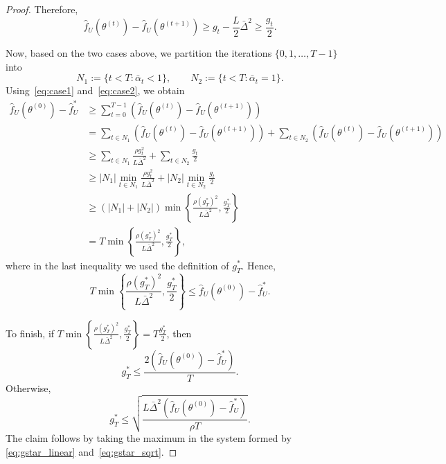 \documentclass{article}
\begin{document}
\begin{proof}
Therefore,
\begin{equation}\label{eq:case2}
    \widehat f_U(\theta^{(t)})
    -
    \widehat f_U(\theta^{(t+1)})
    \ge
    g_t-\frac{L}{2}\bar\Delta^2
    \ge
    \frac{g_t}{2}.
\end{equation}

Now, based on the two cases above, we partition the iterations
\(\{0,1,\ldots,T-1\}\) into
\[
    N_1
    :=
    \{t<T:\bar{\alpha}_t<1\},
    \qquad
    N_2
    :=
    \{t<T:\bar{\alpha}_t=1\}.
\]
Using~\eqref{eq:case1} and~\eqref{eq:case2}, we obtain
\[
\begin{aligned}
    \widehat f_U(\theta^{(0)})-\widehat f_U^*
    &\ge
    \sum_{t=0}^{T-1}
    \left(
        \widehat f_U(\theta^{(t)})
        -
        \widehat f_U(\theta^{(t+1)})
    \right)                                                        \\
    &=
    \sum_{t\in N_1}
    \left(
        \widehat f_U(\theta^{(t)})
        -
        \widehat f_U(\theta^{(t+1)})
    \right)
    +
    \sum_{t\in N_2}
    \left(
        \widehat f_U(\theta^{(t)})
        -
        \widehat f_U(\theta^{(t+1)})
    \right)                                                        \\
    &\ge
    \sum_{t\in N_1}
    \frac{\rho g_t^2}{L\bar\Delta^2}
    +
    \sum_{t\in N_2}
    \frac{g_t}{2}                                                   \\
    &\ge
    |N_1|
    \min_{t\in N_1}
    \frac{\rho g_t^2}{L\bar\Delta^2}
    +
    |N_2|
    \min_{t\in N_2}
    \frac{g_t}{2}                                                   \\
    &\ge
    \left(|N_1|+|N_2|\right)
    \min\left\{
        \frac{\rho (g_T^*)^2}{L\bar\Delta^2},
        \frac{g_T^*}{2}
    \right\}                                                        \\
    &=
    T
    \min\left\{
        \frac{\rho (g_T^*)^2}{L\bar\Delta^2},
        \frac{g_T^*}{2}
    \right\},
\end{aligned}
\]
where in the last inequality we used the definition of $g_T^*$.
Hence,
\[
    T
    \min\left\{
        \frac{\rho (g_T^*)^2}{L\bar\Delta^2},
        \frac{g_T^*}{2}
    \right\}
    \le
    \widehat f_U(\theta^{(0)})-\widehat f_U^*.
\]

To finish, if $    T
    \min\left\{
        \frac{\rho (g_T^*)^2}{L\bar\Delta^2},
        \frac{g_T^*}{2}
    \right\}
    =
    T\frac{g_T^*}{2}$,
then
\begin{equation}\label{eq:gstar_linear}
    g_T^*
    \le
    \frac{
        2\left(
            \widehat f_U(\theta^{(0)})-\widehat f_U^*
        \right)
    }{T}.
\end{equation}
Otherwise,
\begin{equation}\label{eq:gstar_sqrt}
    g_T^*
    \le
    \sqrt{
        \frac{
            L\bar\Delta^2
            \left(
                \widehat f_U(\theta^{(0)})-\widehat f_U^*
            \right)
        }{
            \rho T
        }
    }.
\end{equation}
The claim follows by taking the maximum in the system formed by
\eqref{eq:gstar_linear} and~\eqref{eq:gstar_sqrt}.
\end{proof}
\end{document}
